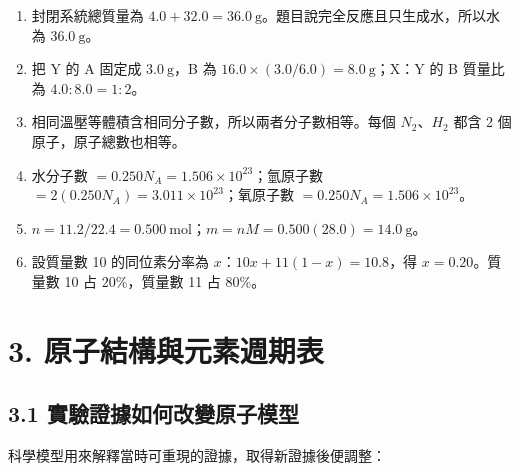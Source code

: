 \documentclass[11pt,a4paper]{article}
\providecommand{\tightlist}{%
  \setlength{\itemsep}{0pt}\setlength{\parskip}{0pt}}
\begin{document}
\begin{enumerate}
\def\labelenumi{\arabic{enumi}.}
\tightlist
\item
  封閉系統總質量為 \(4.0+32.0=36.0\ \mathrm g\)。題目說完全反應且只生成水，所以水為 \(36.0\ \mathrm g\)。
\item
  把 Y 的 A 固定成 \(3.0\ \mathrm g\)，B 為 \(16.0\times(3.0/6.0)=8.0\ \mathrm g\)；X：Y 的 B 質量比為 \(4.0:8.0=1:2\)。
\item
  相同溫壓等體積含相同分子數，所以兩者分子數相等。每個 \(N_2\)、\(H_2\) 都含 2 個原子，原子總數也相等。
\item
  水分子數 \(=0.250N_A=1.506\times10^{23}\)；氫原子數 \(=2(0.250N_A)=3.011\times10^{23}\)；氧原子數 \(=0.250N_A=1.506\times10^{23}\)。
\item
  \(n=11.2/22.4=0.500\ \mathrm{mol}\)；\(m=nM=0.500(28.0)=14.0\ \mathrm g\)。
\item
  設質量數 10 的同位素分率為 \(x\)：\(10x+11(1-x)=10.8\)，得 \(x=0.20\)。質量數 10 占 \(20\%\)，質量數 11 占 \(80\%\)。
\end{enumerate}

\section{3. 原子結構與元素週期表}\label{ux539fux5b50ux7d50ux69cbux8207ux5143ux7d20ux9031ux671fux8868}

\subsection{3.1 實驗證據如何改變原子模型}\label{ux5be6ux9a57ux8b49ux64daux5982ux4f55ux6539ux8b8aux539fux5b50ux6a21ux578b}

科學模型用來解釋當時可重現的證據，取得新證據後便調整：
\end{document}
